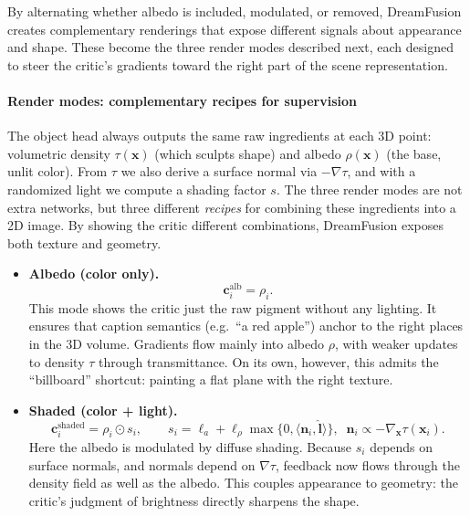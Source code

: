 \begin{enrichment}
\begin{enrichment}
        By alternating whether albedo is included, modulated, or removed, DreamFusion creates complementary renderings that expose different signals about appearance and shape. These become the three render modes described next, each designed to steer the critic’s gradients toward the right part of the scene representation.
        
        \paragraph{Render modes: complementary recipes for supervision}
        \label{par:chapter23_dreamfusion_modes}
        
        The object head always outputs the same raw ingredients at each 3D point: volumetric density \(\tau(\mathbf{x})\) (which sculpts shape) and albedo \(\rho(\mathbf{x})\) (the base, unlit color). From \(\tau\) we also derive a surface normal via \(-\nabla \tau\), and with a randomized light we compute a shading factor \(s\). The three render modes are not extra networks, but three different \emph{recipes} for combining these ingredients into a 2D image. By showing the critic different combinations, DreamFusion exposes both texture and geometry.
        
        \begin{itemize}
            \item \textbf{Albedo (color only).}
            \[
            \mathbf{c}_i^{\text{alb}} = \rho_i .
            \]
            This mode shows the critic just the raw pigment without any lighting. It ensures that caption semantics (e.g.\ “a red apple”) anchor to the right places in the 3D volume. Gradients flow mainly into albedo \(\rho\), with weaker updates to density \(\tau\) through transmittance. On its own, however, this admits the “billboard” shortcut: painting a flat plane with the right texture.
            
            \item \textbf{Shaded (color + light).}
            \[
            \mathbf{c}_i^{\text{shaded}} = \rho_i \odot s_i, \qquad
            s_i=\boldsymbol{\ell}_a + \boldsymbol{\ell}_\rho \max\{0,\langle \mathbf{n}_i,\hat{\mathbf{l}}\rangle\}, \;\;
            \mathbf{n}_i \propto -\nabla_{\mathbf{x}}\tau(\mathbf{x}_i).
            \]
            Here the albedo is modulated by diffuse shading. Because \(s_i\) depends on surface normals, and normals depend on \(\nabla \tau\), feedback now flows through the density field as well as the albedo. This couples appearance to geometry: the critic’s judgment of brightness directly sharpens the shape.
            

\end{itemize}
\end{enrichment}
\end{enrichment}

